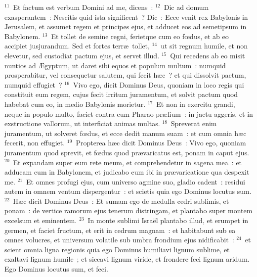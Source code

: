 ${}^{11}$~Et factum est verbum Domini ad me, dicens~:
${}^{12}$~Dic ad domum exasperantem~: Nescitis quid ista significent~? Dic~: Ecce venit rex Babylonis in Jerusalem, et assumet regem et principes ejus, et adducet eos ad semetipsum in Babylonem.
${}^{13}$~Et tollet de semine regni, ferietque cum eo fœdus, et ab eo accipiet jusjurandum. Sed et fortes terr\ae\ tollet,
${}^{14}$~ut sit regnum humile, et non elevetur, sed custodiat pactum ejus, et servet illud.
${}^{15}$~Qui recedens ab eo misit nuntios ad \AE gyptum, ut daret sibi equos et populum multum~: numquid prosperabitur, vel consequetur salutem, qui fecit h\ae c~? et qui dissolvit pactum, numquid effugiet~?
${}^{16}$~Vivo ego, dicit Dominus Deus, quoniam in loco regis qui constituit eum regem, cujus fecit irritum juramentum, et solvit pactum quod habebat cum eo, in medio Babylonis morietur.
${}^{17}$~Et non in exercitu grandi, neque in populo multo, faciet contra eum Pharao pr\ae lium~: in jactu aggeris, et in exstructione vallorum, ut interficiat animas multas.
${}^{18}$~Spreverat enim juramentum, ut solveret fœdus, et ecce dedit manum suam~: et cum omnia h\ae c fecerit, non effugiet.
${}^{19}$~Propterea h\ae c dicit Dominus Deus~: Vivo ego, quoniam juramentum quod sprevit, et fœdus quod pr\ae varicatus est, ponam in caput ejus.
${}^{20}$~Et expandam super eum rete meum, et comprehendetur in sagena mea~: et adducam eum in Babylonem, et judicabo eum ibi in pr\ae varicatione qua despexit me.
${}^{21}$~Et omnes profugi ejus, cum universo agmine suo, gladio cadent~: residui autem in omnem ventum dispergentur~: et scietis quia ego Dominus locutus sum.
${}^{22}$~H\ae c dicit Dominus Deus~: Et sumam ego de medulla cedri sublimis, et ponam~: de vertice ramorum ejus tenerum distringam, et plantabo super montem excelsum et eminentem.
${}^{23}$~In monte sublimi Isra\"el plantabo illud, et erumpet in germen, et faciet fructum, et erit in cedrum magnam~: et habitabunt sub ea omnes volucres, et universum volatile sub umbra frondium ejus nidificabit~:
${}^{24}$~et scient omnia ligna regionis quia ego Dominus humiliavi lignum sublime, et exaltavi lignum humile~; et siccavi lignum viride, et frondere feci lignum aridum. Ego Dominus locutus sum, et feci.

